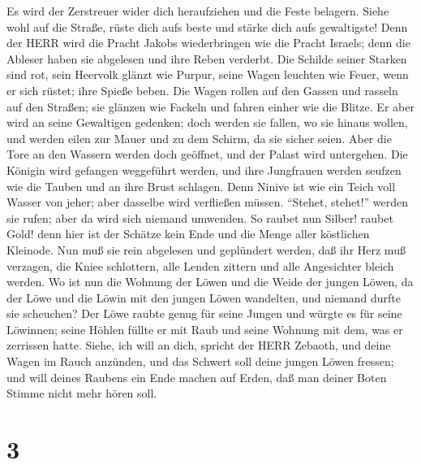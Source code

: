  Es wird der Zerstreuer wider dich heraufziehen und die
Feste belagern. Siehe wohl auf die Straße, rüste dich aufs beste und
stärke dich aufs gewaltigste!  Denn der HERR wird die Pracht
Jakobs wiederbringen wie die Pracht Israels; denn die Ableser haben sie
abgelesen und ihre Reben verderbt.  Die Schilde seiner
Starken sind rot, sein Heervolk glänzt wie Purpur, seine Wagen leuchten
wie Feuer, wenn er sich rüstet; ihre Spieße beben.  Die
Wagen rollen auf den Gassen und rasseln auf den Straßen; sie glänzen wie
Fackeln und fahren einher wie die Blitze.  Er aber wird an
seine Gewaltigen gedenken; doch werden sie fallen, wo sie hinaus wollen,
und werden eilen zur Mauer und zu dem Schirm, da sie sicher seien.
 Aber die Tore an den Wassern werden doch geöffnet, und der
Palast wird untergehen.  Die Königin wird gefangen
weggeführt werden, und ihre Jungfrauen werden seufzen wie die Tauben und
an ihre Brust schlagen.  Denn Ninive ist wie ein Teich voll
Wasser von jeher; aber dasselbe wird verfließen müssen. ``Stehet,
stehet!'' werden sie rufen; aber da wird sich niemand umwenden.
 So raubet nun Silber! raubet Gold! denn hier ist der
Schätze kein Ende und die Menge aller köstlichen Kleinode. 
Nun muß sie rein abgelesen und geplündert werden, daß ihr Herz muß
verzagen, die Kniee schlottern, alle Lenden zittern und alle Angesichter
bleich werden.  Wo ist nun die Wohnung der Löwen und die
Weide der jungen Löwen, da der Löwe und die Löwin mit den jungen Löwen
wandelten, und niemand durfte sie scheuchen?  Der Löwe
raubte genug für seine Jungen und würgte es für seine Löwinnen; seine
Höhlen füllte er mit Raub und seine Wohnung mit dem, was er zerrissen
hatte.  Siehe, ich will an dich, spricht der HERR Zebaoth,
und deine Wagen im Rauch anzünden, und das Schwert soll deine jungen
Löwen fressen; und will deines Raubens ein Ende machen auf Erden, daß
man deiner Boten Stimme nicht mehr hören soll.

\hypertarget{section-2}{%
\section{3}\label{section-2}}

